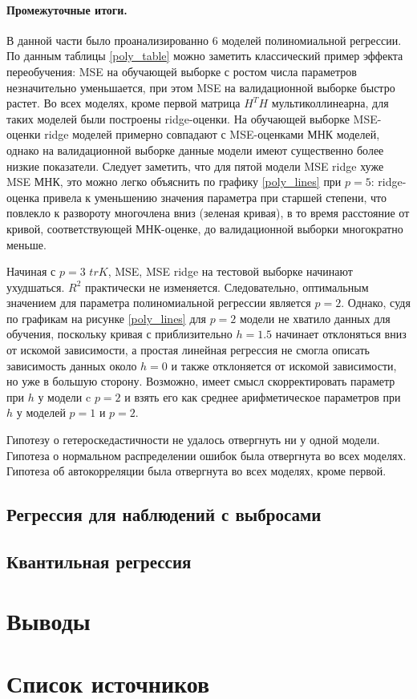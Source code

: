 \documentclass[a4paper,12pt]{article}
\begin{document}
\paragraph{Промежуточные итоги.\\}
В данной части было проанализированно 6 моделей полиномиальной регрессии. По данным таблицы \ref{poly_table} можно заметить классический пример эффекта переобучения: MSE на обучающей выборке с ростом числа параметров незначительно уменьшается, при этом MSE на валидационной выборке быстро растет. Во всех моделях, кроме первой матрица $H^T H$ мультиколлинеарна, для таких моделей были построены ridge-оценки. На обучающей выборке MSE-оценки ridge моделей примерно совпадают с MSE-оценками МНК моделей, однако на валидационной выборке данные модели имеют существенно более низкие показатели. Следует заметить, что для пятой модели MSE ridge хуже MSE МНК, это можно легко объяснить по графику \ref{poly_lines} при $p=5$: ridge-оценка привела к уменьшению значения параметра при старшей степени, что повлекло к развороту многочлена вниз (зеленая кривая), в то время расстояние от кривой, соответствующей МНК-оценке, до валидационной выборки многократно меньше.

Начиная с $p=3$ $tr K$, MSE, MSE ridge на тестовой выборке начинают ухудшаться. $R^2$ практически не изменяется. Следовательно, оптимальным значением для параметра полиномиальной регрессии является $p=2$. Однако, судя по графикам на рисунке \ref{poly_lines} для $p=2$ модели не хватило данных для обучения, поскольку кривая с приблизительно $h=1.5$ начинает отклоняться вниз от искомой зависимости, а простая линейная регрессия не смогла описать зависимость данных около $h=0$ и также отклоняется от искомой зависимости, но уже в большую сторону. Возможно, имеет смысл скорректировать параметр при $h$ у модели c $p=2$ и взять его как среднее арифметическое параметров при $h$ у моделей $p=1$ и $p=2$.

Гипотезу о гетероскедастичности не удалось отвергнуть ни у одной модели. Гипотеза о нормальном распределении ошибок была отвергнута во всех моделях. Гипотеза об автокорреляции была отвергнута во всех моделях, кроме первой.



\subsection{Регрессия для наблюдений с выбросами}





\subsection{Квантильная регрессия}



\section{Выводы}

\section{Список источников}
\end{document}
